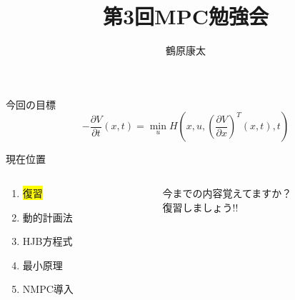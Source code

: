 \documentclass[twocolumn, dvipdfmx,12pt]{beamer}
\title{第3回MPC勉強会}
\author{鶴原康太}
\begin{document}
    \frame{\maketitle}

    \begin{frame}{今回の目標}
        \begin{equation*}
            -\frac{\partial V}{\partial t}\left(x,t\right) = \min _u H\left(x, u, \left( \frac{\partial V}{\partial x} \right)^T\left(x, t\right), t \right)
        \end{equation*}
    \end{frame}

    \begin{frame}{現在位置}
        \begin{columns}
            \begin{column}{.4\textwidth}
                \begin{enumerate}
                    \item \colorbox{yellow}{復習}
                    \item 動的計画法
                    \item HJB方程式
                    \item 最小原理
                    \item NMPC導入
                \end{enumerate}
            \end{column}
    
            \begin{column}{.6\textwidth}
                今までの内容覚えてますか？\\
                復習しましょう!!
            \end{column}
        \end{columns}
    \end{frame}
\end{document}
